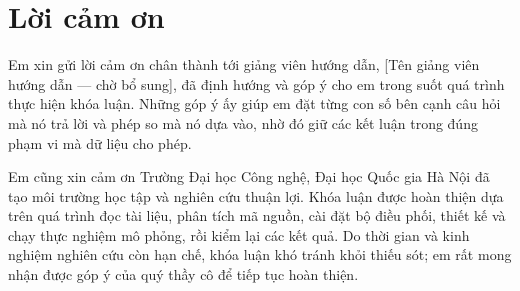 \chapter*{Lời cảm ơn}

Em xin gửi lời cảm ơn chân thành tới giảng viên hướng dẫn, [Tên giảng viên hướng dẫn — chờ bổ sung], đã định hướng
và góp ý cho em trong suốt quá trình thực hiện khóa luận. Những góp ý ấy giúp em đặt từng con số bên cạnh câu hỏi
mà nó trả lời và phép so mà nó dựa vào, nhờ đó giữ các kết luận trong đúng phạm vi mà dữ liệu cho phép.

Em cũng xin cảm ơn Trường Đại học Công nghệ, Đại học Quốc gia Hà Nội đã tạo môi trường học tập và nghiên cứu thuận
lợi. Khóa luận được hoàn thiện dựa trên quá trình đọc tài liệu, phân tích mã nguồn, cài đặt bộ điều phối, thiết kế
và chạy thực nghiệm mô phỏng, rồi kiểm lại các kết quả. Do thời gian và kinh nghiệm nghiên cứu còn hạn chế, khóa luận
khó tránh khỏi thiếu sót; em rất mong nhận được góp ý của quý thầy cô để tiếp tục hoàn thiện.

\clearpage

